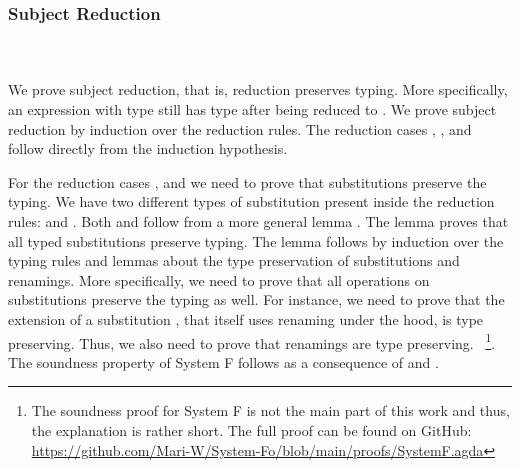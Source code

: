 \subsubsection{Subject Reduction}\hfill\\\\
We prove subject reduction, that is, reduction preserves typing. More specifically, an expression  with type  still has type  after being reduced to . We prove subject reduction by induction over the reduction rules. 
\FSubjectReduction
The  reduction cases , ,  and  follow directly from the induction hypothesis. 

\noindent For the  reduction cases ,  and  we need to prove that substitutions preserve the typing. We have two different types of substitution present inside the reduction rules:  \Data{[}  \Data{]} and  \Data{[}  \Data{]}.
Both  and  follow from a more general lemma . The lemma  proves that all typed substitutions preserve typing.
\Fpreserves
The lemma  follows by induction over the typing rules and lemmas about the type preservation of substitutions and renamings. 
More specifically, we need to prove that all operations on substitutions preserve the typing as well. 
For instance, we need to prove that the extension of a substitution , that itself uses renaming under the hood, is type preserving. Thus, we also need to prove that renamings are type preserving.
~\footnote{The soundness proof for System F is not the main part of this work and thus, the explanation is rather short. The full proof can be found on GitHub: \url{https://github.com/Mari-W/System-Fo/blob/main/proofs/SystemF.agda}}.
\noindent The soundness property of System F follows as a consequence of  and . 